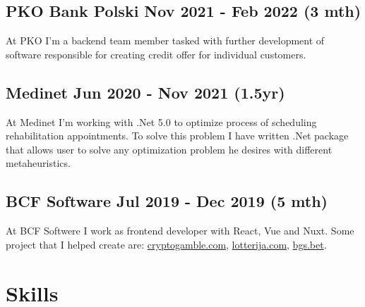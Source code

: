 \documentclass[10pt]{article}
\begin{document}
\subsection{PKO Bank Polski Nov 2021 - Feb 2022 (3 mth)}
At PKO I'm a backend team member tasked with further development of software responsible for creating credit offer for individual customers.
\subsection{Medinet Jun 2020 - Nov 2021 (1.5yr)}
At Medinet I'm working with .Net 5.0 to optimize process of scheduling rehabilitation appointments. To solve this problem I have written .Net package that allows user to solve any optimization problem he desires with different metaheuristics.
\subsection{BCF Software Jul 2019 - Dec 2019 (5 mth) }
At BCF Softwere I work as frontend developer with React, Vue and Nuxt. Some project that I helped create are:
    \href{https://cryptogamble.com}{cryptogamble.com}, \href{https://lotterija.com}{lotterija.com}, \href{https://bgs.bet}{bgs.bet}.

\newpage
\section{Skills}
\end{document}
